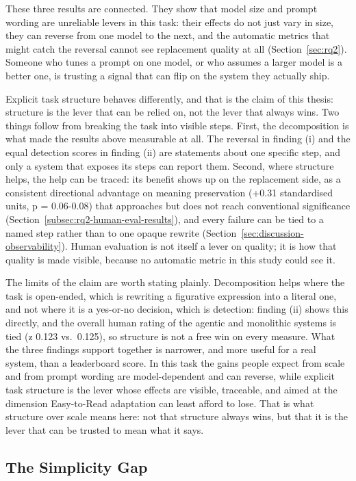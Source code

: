 These three results are connected. They show that model size and prompt wording are unreliable levers in this task: their effects do not just vary in size, they can reverse from one model to the next, and the automatic metrics that might catch the reversal cannot see replacement quality at all (Section~\ref{sec:rq2}). Someone who tunes a prompt on one model, or who assumes a larger model is a better one, is trusting a signal that can flip on the system they actually ship.

Explicit task structure behaves differently, and that is the claim of this thesis: structure is the lever that can be relied on, not the lever that always wins. Two things follow from breaking the task into visible steps. First, the decomposition is what made the results above measurable at all. The reversal in finding (i) and the equal detection scores in finding (ii) are statements about one specific step, and only a system that exposes its steps can report them. Second, where structure helps, the help can be traced: its benefit shows up on the replacement side, as a consistent directional advantage on meaning preservation (+0.31 standardised units, p = 0.06-0.08) that approaches but does not reach conventional significance (Section~\ref{subsec:rq2-human-eval-results}), and every failure can be tied to a named step rather than to one opaque rewrite (Section~\ref{sec:discussion-observability}). Human evaluation is not itself a lever on quality; it is how that quality is made visible, because no automatic metric in this study could see it.

The limits of the claim are worth stating plainly. Decomposition helps where the task is open-ended, which is rewriting a figurative expression into a literal one, and not where it is a yes-or-no decision, which is detection: finding (ii) shows this directly, and the overall human rating of the agentic and monolithic systems is tied (z 0.123 vs.\ 0.125), so structure is not a free win on every measure. What the three findings support together is narrower, and more useful for a real system, than a leaderboard score. In this task the gains people expect from scale and from prompt wording are model-dependent and can reverse, while explicit task structure is the lever whose effects are visible, traceable, and aimed at the dimension Easy-to-Read adaptation can least afford to lose. That is what structure over scale means here: not that structure always wins, but that it is the lever that can be trusted to mean what it says.

\subsection{The Simplicity Gap}

